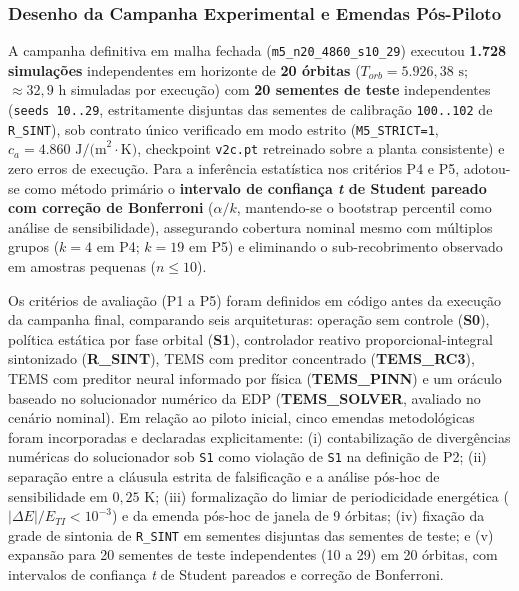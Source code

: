 \subsubsection{Desenho da Campanha Experimental e Emendas Pós-Piloto}

A campanha definitiva em malha fechada (\texttt{m5\_n20\_4860\_s10\_29}) executou \textbf{1.728 simulações} independentes em horizonte de \textbf{20 órbitas} ($T_{orb} = 5.926{,}38\text{ s}$; $\approx 32{,}9\text{ h}$ simuladas por execução) com \textbf{20 sementes de teste} independentes (\texttt{seeds 10..29}, estritamente disjuntas das sementes de calibração \texttt{100..102} de \texttt{R\_SINT}), sob contrato único verificado em modo estrito (\texttt{M5\_STRICT=1}, $c_a = 4.860\text{ J/(m}^2\cdot\text{K)}$, checkpoint \texttt{v2c.pt} retreinado sobre a planta consistente) e zero erros de execução. Para a inferência estatística nos critérios P4 e P5, adotou-se como método primário o \textbf{intervalo de confiança \textit{t} de Student pareado com correção de Bonferroni} ($\alpha / k$, mantendo-se o bootstrap percentil como análise de sensibilidade), assegurando cobertura nominal mesmo com múltiplos grupos ($k = 4$ em P4; $k = 19$ em P5) e eliminando o sub-recobrimento observado em amostras pequenas ($n \le 10$).

Os critérios de avaliação (P1 a P5) foram definidos em código antes da execução da campanha final, comparando seis arquiteturas: operação sem controle (\textbf{S0}), política estática por fase orbital (\textbf{S1}), controlador reativo proporcional-integral sintonizado (\textbf{R\_SINT}), TEMS com preditor concentrado (\textbf{TEMS\_RC3}), TEMS com preditor neural informado por física (\textbf{TEMS\_PINN}) e um oráculo baseado no solucionador numérico da EDP (\textbf{TEMS\_SOLVER}, avaliado no cenário nominal). Em relação ao piloto inicial, cinco emendas metodológicas foram incorporadas e declaradas explicitamente: (i) contabilização de divergências numéricas do solucionador sob \texttt{S1} como violação de \texttt{S1} na definição de P2; (ii) separação entre a cláusula estrita de falsificação e a análise pós-hoc de sensibilidade em $0{,}25\text{ K}$; (iii) formalização do limiar de periodicidade energética ($|\Delta E|/E_{TI} < 10^{-3}$) e da emenda pós-hoc de janela de 9 órbitas; (iv) fixação da grade de sintonia de \texttt{R\_SINT} em sementes disjuntas das sementes de teste; e (v) expansão para 20 sementes de teste independentes (10 a 29) em 20 órbitas, com intervalos de confiança \textit{t} de Student pareados e correção de Bonferroni.

